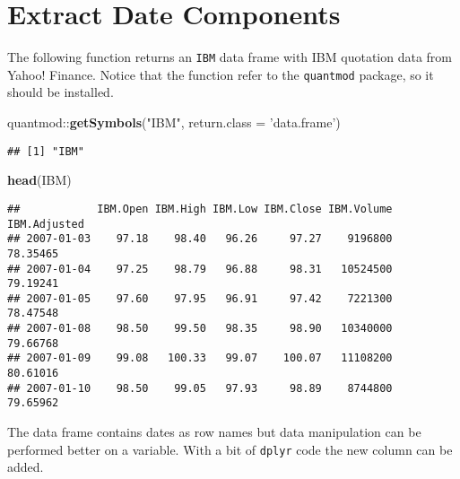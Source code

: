 \documentclass[]{book}
\newenvironment{Shaded}{\begin{snugshade}}{\end{snugshade}}
\newcommand{\KeywordTok}[1]{\textcolor[rgb]{0.13,0.29,0.53}{\textbf{{#1}}}}
\newcommand{\DataTypeTok}[1]{\textcolor[rgb]{0.13,0.29,0.53}{{#1}}}
\newcommand{\StringTok}[1]{\textcolor[rgb]{0.31,0.60,0.02}{{#1}}}
\newcommand{\NormalTok}[1]{{#1}}
\begin{document}
\section{Extract Date Components}\label{extract-date-components}

The following function returns an \texttt{IBM} data frame with IBM
quotation data from Yahoo! Finance. Notice that the function refer to
the \texttt{quantmod} package, so it should be installed.

\begin{Shaded}
\begin{Highlighting}[]
\NormalTok{quantmod::}\KeywordTok{getSymbols}\NormalTok{(}\StringTok{"IBM"}\NormalTok{, }\DataTypeTok{return.class =} \StringTok{'data.frame'}\NormalTok{)}
\end{Highlighting}
\end{Shaded}

\begin{verbatim}
## [1] "IBM"
\end{verbatim}

\begin{Shaded}
\begin{Highlighting}[]
\KeywordTok{head}\NormalTok{(IBM)}
\end{Highlighting}
\end{Shaded}

\begin{verbatim}
##            IBM.Open IBM.High IBM.Low IBM.Close IBM.Volume IBM.Adjusted
## 2007-01-03    97.18    98.40   96.26     97.27    9196800     78.35465
## 2007-01-04    97.25    98.79   96.88     98.31   10524500     79.19241
## 2007-01-05    97.60    97.95   96.91     97.42    7221300     78.47548
## 2007-01-08    98.50    99.50   98.35     98.90   10340000     79.66768
## 2007-01-09    99.08   100.33   99.07    100.07   11108200     80.61016
## 2007-01-10    98.50    99.05   97.93     98.89    8744800     79.65962
\end{verbatim}

The data frame contains dates as row names but data manipulation can be
performed better on a variable. With a bit of \texttt{dplyr} code the
new column can be added.

\begin{Shaded}
\end{Shaded}
\end{document}
